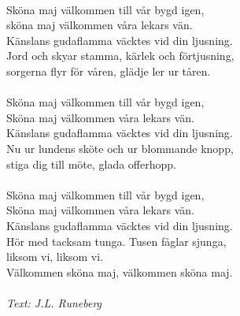\vspace{10pt}\\
Sköna maj välkommen till vår bygd igen,\\
sköna maj välkommen våra lekars vän.\\
Känslans gudaflamma väcktes vid din ljusning.\\
Jord och skyar stamma, kärlek och förtjusning,\\
sorgerna flyr för våren, glädje ler ur tåren.\\
\\
Sköna maj välkommen till vår bygd igen,\\
Sköna maj välkommen våra lekars vän.\\
Känslans gudaflamma väcktes vid din ljusning.\\
Nu ur lundens sköte och ur blommande knopp,\\
stiga dig till möte, glada offerhopp.\\
\\
Sköna maj välkommen till vår bygd igen,\\
Sköna maj välkommen våra lekars vän.\\
Känslans gudaflamma väcktes vid din ljusning.\\
Hör med tacksam tunga. Tusen fåglar sjunga,\\
liksom vi, liksom vi.\\
Välkommen sköna maj, välkommen sköna maj.\\
\\
{\footnotesize\textit{Text: J.L. Runeberg}}
